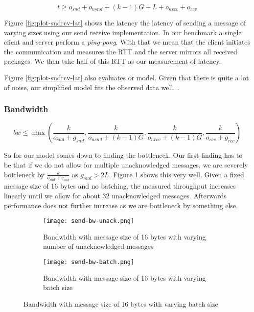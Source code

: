 $$
t \geq o_{snd} + o_{nsnd}  + (k-1)G + L + o_{nrcv} + o_{rcv}
$$

Figure \ref{fig:plot-sndrcv-lat} shows the latency the latency of sending a message of varying sizes using our send receive 
implementation. In our benchmark a single client and server 
perform a \emph{ping-pong}. With that we mean that the client initiates the communication and measures the RTT and the server
mirrors all received packages. We then take half of this RTT as our measurement of latency.


Figure \ref{fig:plot-sndrcv-lat} also evaluates or model. Given that there is quite a lot of noise, our simplified model fits
the observed data well. . 

\subsubsection{Bandwidth}


$$
bw \leq \max ( \frac{k}{o_{snd} + g_{snd}}, \frac{k}{o_{nsnd} + (k-1)G}, \frac{k}{o_{nrcv} + (k-1)G}, \frac{k}{o_{rcv} + g_{rcv}})
$$

So for our model comes down to finding the bottleneck. Our first finding has to be that if we do not allow for multiple 
unacknowledged messages, we are severely bottleneck by $\frac{k}{o_{snd} + g_{snd}}$ as $g_{snd} > 2L$. Figure 
\ref{fig:plot-sndrcv-bw-unack} shows this very well. Given a fixed message size of 16 bytes and no batching, the measured 
throughput increases linearly until we allow for about 32 unacknowledged messages. Afterwards performance does not further 
increase as we are bottleneck by something else. 

\begin{figure}[h]
\begin{subfigure}[b]{0.49\textwidth}
  \centering
  \texttt{[image: send-bw-unack.png]}
  \caption{Bandwidth with message size of 16 bytes with varying number of unacknowledged messages}
  \label{fig:plot-sndrcv-bw-unack}
\end{subfigure}
\begin{subfigure}[b]{0.49\textwidth}
  \centering
  \texttt{[image: send-bw-batch.png]}
  \caption{Bandwidth with message size of 16 bytes with varying batch size }
  \label{fig:plot-sndrcv-bw-batch}
\end{subfigure}
\end{figure}



